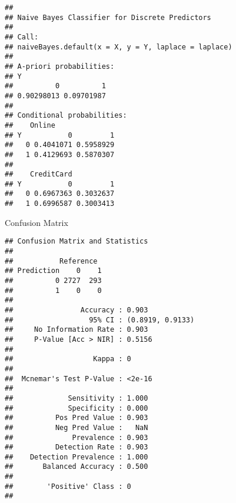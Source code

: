 \documentclass[
]{article}
\newenvironment{Shaded}{\begin{snugshade}}{\end{snugshade}}
\newcommand{\AttributeTok}[1]{\textcolor[rgb]{0.77,0.63,0.00}{#1}}
\newcommand{\ConstantTok}[1]{\textcolor[rgb]{0.00,0.00,0.00}{#1}}
\newcommand{\FunctionTok}[1]{\textcolor[rgb]{0.00,0.00,0.00}{#1}}
\newcommand{\NormalTok}[1]{#1}
\newcommand{\OtherTok}[1]{\textcolor[rgb]{0.56,0.35,0.01}{#1}}
\newcommand{\SpecialCharTok}[1]{\textcolor[rgb]{0.00,0.00,0.00}{#1}}
\begin{document}
\begin{verbatim}
## 
## Naive Bayes Classifier for Discrete Predictors
## 
## Call:
## naiveBayes.default(x = X, y = Y, laplace = laplace)
## 
## A-priori probabilities:
## Y
##          0          1 
## 0.90298013 0.09701987 
## 
## Conditional probabilities:
##    Online
## Y           0         1
##   0 0.4041071 0.5958929
##   1 0.4129693 0.5870307
## 
##    CreditCard
## Y           0         1
##   0 0.6967363 0.3032637
##   1 0.6996587 0.3003413
\end{verbatim}

Confusion Matrix

\begin{Shaded}
\end{Shaded}

\begin{verbatim}
## Confusion Matrix and Statistics
## 
##           Reference
## Prediction    0    1
##          0 2727  293
##          1    0    0
##                                           
##                Accuracy : 0.903           
##                  95% CI : (0.8919, 0.9133)
##     No Information Rate : 0.903           
##     P-Value [Acc > NIR] : 0.5156          
##                                           
##                   Kappa : 0               
##                                           
##  Mcnemar's Test P-Value : <2e-16          
##                                           
##             Sensitivity : 1.000           
##             Specificity : 0.000           
##          Pos Pred Value : 0.903           
##          Neg Pred Value :   NaN           
##              Prevalence : 0.903           
##          Detection Rate : 0.903           
##    Detection Prevalence : 1.000           
##       Balanced Accuracy : 0.500           
##                                           
##        'Positive' Class : 0               
## 
\end{verbatim}

\begin{Shaded}
\end{Shaded}
\end{document}
